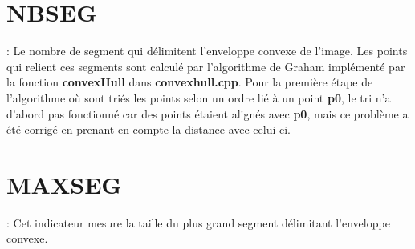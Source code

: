 \documentclass{report}
\begin{document}
\section{NBSEG} : Le nombre de segment qui délimitent l'enveloppe convexe de l'image. Les points qui relient ces segments sont calculé par l'algorithme de Graham implémenté par la fonction \textbf{convexHull} dans \textbf{convexhull.cpp}. Pour la première étape de l'algorithme où sont triés les points selon un ordre lié à un point \textbf{p0}, le tri n'a d'abord pas fonctionné car des points étaient alignés avec \textbf{p0}, mais ce problème a été corrigé en prenant en compte la distance avec celui-ci.
\section{MAXSEG} : Cet indicateur mesure la taille du plus grand segment délimitant l'enveloppe convexe.

 
\end{document}

